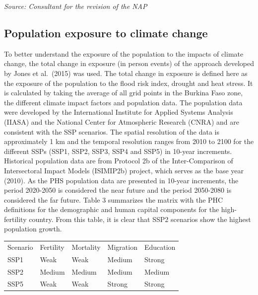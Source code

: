 \documentclass[
]{book}
\begin{document}
\emph{Source: Consultant for the revision of the NAP}

\subsection{Population exposure to climate change}\label{population-exposure-to-climate-change}

To better understand the exposure of the population to the impacts of climate change, the total change in exposure (in person events) of the approach developed by Jones et al.~(2015) was used. The total change in exposure is defined here as the exposure of the population to the flood risk index, drought and heat stress. It is calculated by taking the average of all grid points in the Burkina Faso zone, the different climate impact factors and population data. The population data were developed by the International Institute for Applied Systems Analysis (IIASA) and the National Center for Atmospheric Research (CNRA) and are consistent with the SSP scenarios. The spatial resolution of the data is approximately 1 km and the temporal resolution ranges from 2010 to 2100 for the different SSPs (SSP1, SSP2, SSP3, SSP4 and SSP5) in 10-year increments. Historical population data are from Protocol 2b of the Inter-Comparison of Intersectoral Impact Models (ISIMIP2b) project, which serves as the base year (2010). As the PHS population data are presented in 10-year increments, the period 2020-2050 is considered the near future and the period 2050-2080 is considered the far future. Table 3 summarizes the matrix with the PHC definitions for the demographic and human capital components for the high-fertility country. From this table, it is clear that SSP2 scenarios show the highest population growth.

\begin{tabular}{>{\raggedright\arraybackslash}p{15em}|>{\raggedright\arraybackslash}p{15em}|>{\raggedright\arraybackslash}p{15em}|>{\raggedright\arraybackslash}p{15em}|>{\raggedright\arraybackslash}p{15em}}
\hline
\multicolumn{5}{c}{Table 3: Matrix with SSP definitions for demographic and human capital components for the high-fertility country} \\
\cline{1-5}
Scenario & Fertility & Mortality & Migration & Education\\
\hline
SSP1 & Weak & Weak & Medium & Strong\\
\hline
SSP2 & Medium & Medium & Medium & Medium\\
\hline
SSP5 & Weak & Weak & Strong & Strong\\
\hline
\end{tabular}
\end{document}
